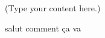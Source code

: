 \documentclass{article}
\begin{document}
(Type your content here.)

salut comment ça va
\end{document}
